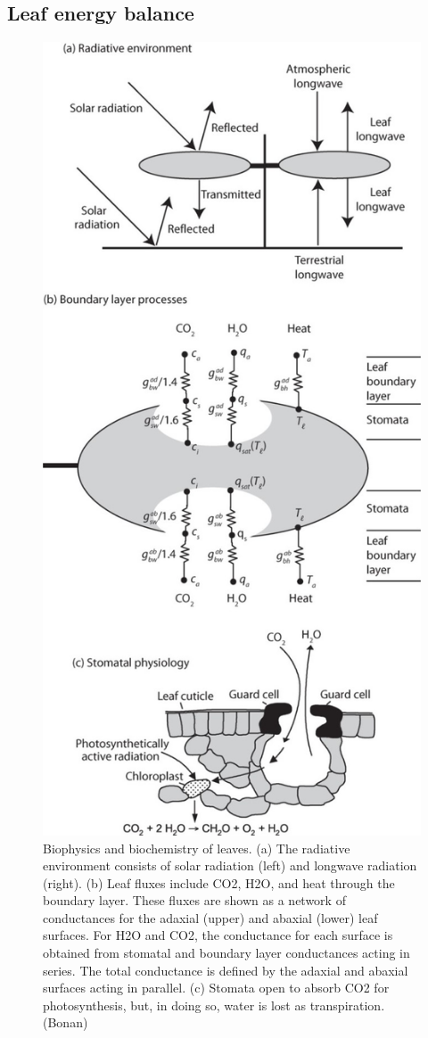 \documentclass[12pt,oneside]{book}
\begin{document}
\subsection{Leaf energy balance}\label{leaf-energy-balance}

\begin{figure}

{\centering \includegraphics[width=0.8\linewidth]{figures/chap3/f331_leaf_E_balance} 

}

\caption{Biophysics and biochemistry of leaves. (a) The radiative environment consists of solar radiation (left) and longwave radiation (right). (b) Leaf fluxes include CO2, H2O, and heat through the boundary layer. These fluxes are shown as a network of conductances for the adaxial (upper) and abaxial (lower) leaf surfaces. For H2O and CO2, the conductance for each surface is obtained from stomatal and boundary layer conductances acting in series. The total conductance is defined by the adaxial and abaxial surfaces acting in parallel. (c) Stomata open to absorb CO2 for photosynthesis, but, in doing so, water is lost as transpiration. (Bonan)}\label{fig:f331}
\end{figure}
\end{document}
